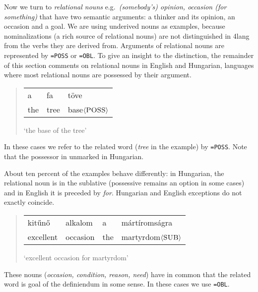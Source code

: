 \documentclass[a4paper,10pt]{article}
\begin{document}
Now we turn to \emph{relational nouns} e.g.\ \emph{(somebody's) opinion,
  occasion (for something)} that have two semantic arguments: a thinker and
its opinion, an occasion and a goal. We are using underived nouns as examples,
because nominalizations (a rich source of relational nouns) are not
distinguished in 4lang from the verbs they are derived from.  Arguments of
relational nouns are represented by \texttt{=POSS} or \texttt{=OBL}. To give
an insight to the distinction, the remainder of this section comments on
relational nouns in English and Hungarian, languages where most {relational
  nouns} are possessed by their argument.
\begin{quote}
 \begin{tabular}{lll}
  a &fa &töve
 \\the &tree &base$\langle\textsc{POSS}\rangle$
 \end{tabular}
 
 `the base of the tree'
\end{quote}
In these cases we refer to the related word (\emph{tree} in the example) by
\texttt{=POSS}. Note that the possessor in unmarked in Hungarian.
 
About ten percent of the examples behave differently: in Hungarian, the
relational noun is in the sublative (possessive remains an option in some
cases) and in English it is preceded by \emph{for}. Hungarian and English
exceptions do not exactly coincide.
\begin{quote}
 \begin{tabular}{llll}
  kitűnő		& alkalom	& a & mártíromságra
 \\ excellent	& occasion 	& the & martyrdom$\langle\textsc{SUB}\rangle$
 \end{tabular}
 
 `excellent occasion for martyrdom'
\end{quote}
These nouns (\emph{occasion, condition, reason, need}) have in common that the related word is goal of the definiendum in some sense. In these cases we use \texttt{=OBL}.
\end{document}
